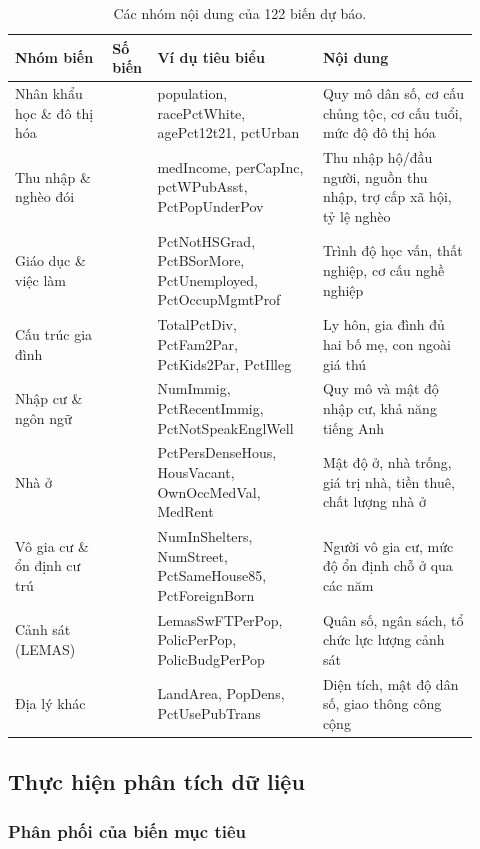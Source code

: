 \begin{landscape}
\small
\begin{longtable}[t]{
  >{\raggedright\arraybackslash}p{0.20\linewidth}
  >{\centering\arraybackslash}p{0.06\linewidth}
  >{\raggedright\arraybackslash}p{0.34\linewidth}
  >{\raggedright\arraybackslash}p{0.32\linewidth}}
\caption{\label{tab:bang-nhom-bien}Các nhóm nội dung của 122 biến dự báo.}\\
\toprule
Nhóm biến & Số biến & Ví dụ tiêu biểu & Nội dung\\
\midrule
Nhân khẩu học \& đô thị hóa & 12 & population, racePctWhite, agePct12t21, pctUrban & Quy mô dân số, cơ cấu chủng tộc, cơ cấu tuổi, mức độ đô thị hóa\\
Thu nhập \& nghèo đói & 17 & medIncome, perCapInc, pctWPubAsst, PctPopUnderPov & Thu nhập hộ/đầu người, nguồn thu nhập, trợ cấp xã hội, tỷ lệ nghèo\\
Giáo dục \& việc làm & 9 & PctNotHSGrad, PctBSorMore, PctUnemployed, PctOccupMgmtProf & Trình độ học vấn, thất nghiệp, cơ cấu nghề nghiệp\\
Cấu trúc gia đình & 13 & TotalPctDiv, PctFam2Par, PctKids2Par, PctIlleg & Ly hôn, gia đình đủ hai bố mẹ, con ngoài giá thú\\
Nhập cư \& ngôn ngữ & 11 & NumImmig, PctRecentImmig, PctNotSpeakEnglWell & Quy mô và mật độ nhập cư, khả năng tiếng Anh\\
\addlinespace
Nhà ở & 27 & PctPersDenseHous, HousVacant, OwnOccMedVal, MedRent & Mật độ ở, nhà trống, giá trị nhà, tiền thuê, chất lượng nhà ở\\
Vô gia cư \& ổn định cư trú & 7 & NumInShelters, NumStreet, PctSameHouse85, PctForeignBorn & Người vô gia cư, mức độ ổn định chỗ ở qua các năm\\
Cảnh sát (LEMAS) & 23 & LemasSwFTPerPop, PolicPerPop, PolicBudgPerPop & Quân số, ngân sách, tổ chức lực lượng cảnh sát\\
Địa lý khác & 3 & LandArea, PopDens, PctUsePubTrans & Diện tích, mật độ dân số, giao thông công cộng\\
\bottomrule
\end{longtable}
\end{landscape}

\subsection{Thực hiện phân tích dữ
liệu}\label{thux1ef1c-hiux1ec7n-phuxe2n-tuxedch-dux1eef-liux1ec7u}

\subsubsection{Phân phối của biến mục
tiêu}\label{phuxe2n-phux1ed1i-cux1ee7a-biux1ebfn-mux1ee5c-tiuxeau}

